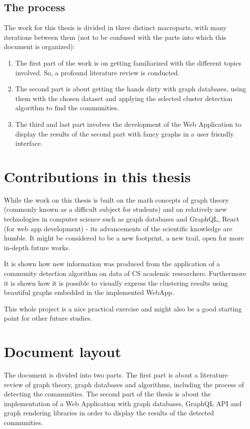 \subsection{The process} \label{subsection:Introduction/Aimandobjectives/How}
The work for this thesis is divided in three distinct macroparts, with many iterations between them (not to be confused with the parts into which this document is organized):
 \begin{enumerate}[noitemsep]
	\item The first part of the work is on getting familiarized with the different topics involved.
    So, a profound literature review is conducted.
	\item The second part is about getting the hands dirty with graph databases, using them with the chosen dataset and applying the selected cluster detection algorithm to find the communities.
	\item The third and last part involves the development of the \gls{Web Application} to display the results of the second part with fancy graphs in a user friendly interface.
\end{enumerate}

\section{Contributions in this thesis} \label{section:Introduction/Contributionsinthisthesis}
While the work on this thesis is built on the math concepts of graph theory (commonly known as a difficult subject for students) and on relatively new technologies in computer science such as graph databases and \gls{GraphQL}, React (for web app development) - its advancements of the scientific knowledge are humble.
It might be considered to be a new footprint, a new trail, open for more in-depth future works.

It is shown how new information was produced from the application of a community detection algorithm on data of CS academic researchers.
Furthermore it is shown how it is possible to visually express the clustering results using beautiful graphs embedded in the implemented \gls{WebApp}.

This whole project is a nice practical exercise and might also be a good starting point for other future studies.

\section{Document layout} \label{section:Introduction/Documentlayout}
The document is divided into two parts.
The first part is about a literature review of graph theory, graph databases and algorithms, including the process of detecting the communities.
The second part of the thesis is about the implementation of a \gls{Web Application} with graph databases, \gls{GraphQL} \acrshort{API} and graph rendering libraries in order to display the results of the detected communities.
\medskip

